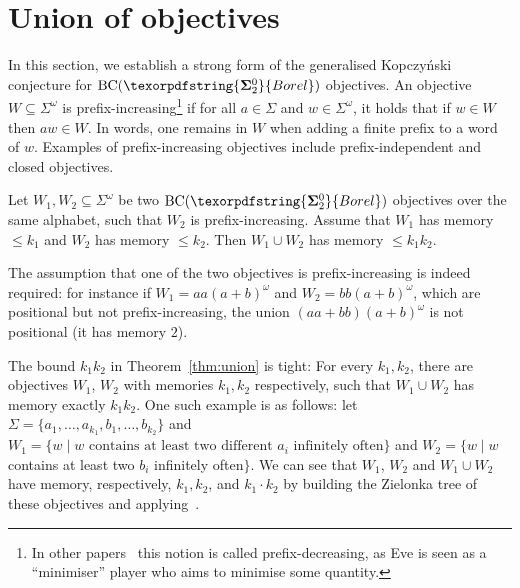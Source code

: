 \documentclass[a4paper,UKenglish,cleveref, thm-restate]{lipics-v2021}
\newcommand\ac[1]{\todo[inline,size=\scriptsize,backgroundcolor=yellow]{#1 - \textbf{Antonio}}}
\newcommand{\boldclass}[3]{\texorpdfstring{\ensuremath{\mathbf{#1}^{#2}_{#3}}}{Borel}}
\newcommand{\bsigma}[1]{\boldclass{\Sigma}{0}{#1}}
\newcommand{\BCSigma}{\mathrm{BC}(\boldclass{\Sigma}{0}{2})}
\newcommand{\BC}{\text{BC}}
\newcommand{\oo}{\omega}
\renewcommand{\SS}{\Sigma}
\begin{document}
\section{Union of objectives}\label{sec:union}


In this section, we establish a strong form of the generalised Kopczyński conjecture for $\BCSigma$ objectives.
An objective $W \subseteq \Sigma^\omega$ is prefix-increasing\footnote{In other papers~\cite{Ohlmann21PhD,Ohlmann23,CO25LMCS} this notion is called prefix-decreasing, as Eve is seen as a ``minimiser'' player who aims to minimise some quantity.}
 if for all $a \in \Sigma$ and $w \in \Sigma^\omega$, it holds that if $w \in W$ then $aw \in W$.
In words, one remains in $W$ when adding a finite prefix to a word of $w$.
Examples of prefix-increasing objectives include prefix-independent and closed objectives.
\ac{Other interesting clases? }


\begin{theorem}\label{thm:union}
    Let $W_1, W_2 \subseteq \SS^\oo$ be two $\BC(\bsigma 2)$ objectives over the same alphabet, such that $W_{2}$ is prefix-increasing.
    Assume that $W_{1}$ has memory $\leq k_1$ and $W_{2}$ has memory $\leq k_2$.
    Then $W_1 \cup W_2$ has memory $\leq k_1 k_2$.
\end{theorem}

\begin{remark}
The assumption that one of the two objectives is prefix-increasing is indeed required: for instance if $W_1=aa(a+b)^\omega$ and $W_{2}=bb(a+b)^\omega$, which are positional but not prefix-increasing, the union $(aa+bb)(a+b)^\omega$ is not positional (it has memory $2$).

\end{remark}
\begin{remark}
    The bound $k_1k_2$ in Theorem~\ref{thm:union} is tight: For every $k_1, k_2$, there are objectives $W_1$, $W_2$ with memories $k_1, k_2$ respectively, such that $W_1 \cup W_2$ has memory exactly $k_1k_2$. 
    One such example is as follows: let $\SS = \{a_1,\dots, a_{k_1}, b_1,\dots, b_{k_2}\}$ and 
    $W_1 = \{ w \mid w \text{ contains at } \text{least } \text{two } \text{different } a_i \text{ infinitely often} \}$ and $W_2 = \{ w \mid w$ contains at least two  $b_i$ infinitely often$\}$. 
    We can see that $W_1$, $W_2$ and $W_1\cup W_2$ have memory, respectively, $k_1, k_2$, and  $k_1\cdot k_2$ by building the Zielonka tree of these objectives and applying~\cite[Thms.~6,~14]{DJW1997memory}.
\end{remark}
\end{document}
